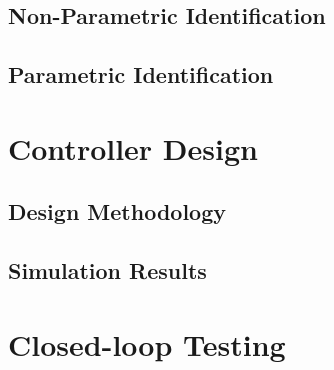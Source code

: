 \documentclass[11pt]{article}
\begin{document}
\subsection{Non-Parametric Identification}

\subsection{Parametric Identification}


\section{Controller Design}
\label{sec:control}

\subsection{Design Methodology}

\subsection{Simulation Results}


\section{Closed-loop Testing}
\label{sec:closedLoop}
\end{document}
